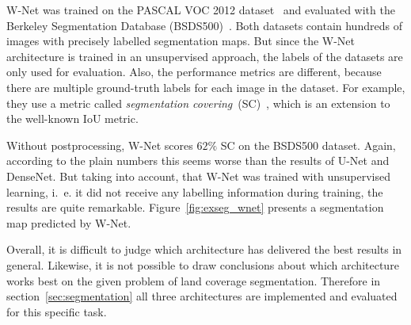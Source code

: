 W-Net was trained on the PASCAL VOC 2012 dataset~\cite{pascal_voc12} and evaluated with the Berkeley Segmentation Database (BSDS500)~\cite{hierarchy_imgseg11}. Both datasets contain hundreds of images with precisely labelled segmentation maps. But since the W-Net architecture is trained in an unsupervised approach, the labels of the datasets are only used for evaluation. Also, the performance metrics are different, because there are multiple ground-truth labels for each image in the dataset. For example, they use a metric called \emph{segmentation covering}~(SC)~\cite{hierarchy_imgseg11}, which is an extension to the well-known IoU metric.

Without postprocessing, W-Net scores $62\%$ SC on the BSDS500 dataset. Again, according to the plain numbers this seems worse than the results of U-Net and DenseNet. But taking into account, that W-Net was trained with unsupervised learning, i.~e. it did not receive any labelling information during training, the results are quite remarkable. Figure~\ref{fig:exseg_wnet} presents a segmentation map predicted by W-Net.

Overall, it is difficult to judge which architecture has delivered the best results in general. Likewise, it is not possible to draw conclusions about which architecture works best on the given problem of land coverage segmentation. Therefore in section~\ref{sec:segmentation} all three architectures are implemented and evaluated for this specific task.

